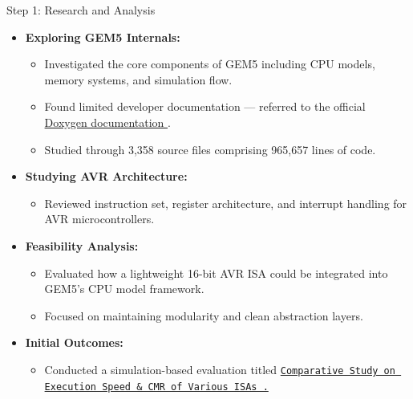 \begin{frame}{Step 1: Research and Analysis}
	\begin{itemize}
		\item \textbf{Exploring GEM5 Internals:}
		      \begin{itemize}
			      \item Investigated the core components of GEM5 including CPU models, memory systems, and simulation flow.
			      \item Found limited developer documentation — referred to the official \href{https://doxygen.gem5.org/develop/index.html}{Doxygen documentation \faLink}.
			      \item Studied through 3,358 source files comprising 965,657 lines of code.
		      \end{itemize}

		\item \textbf{Studying AVR Architecture:}
		      \begin{itemize}
			      \item Reviewed instruction set, register architecture, and interrupt handling for AVR microcontrollers.
		      \end{itemize}

		\item \textbf{Feasibility Analysis:}
		      \begin{itemize}
			      \item Evaluated how a lightweight 16-bit AVR ISA could be integrated into GEM5’s CPU model framework.
			      \item Focused on maintaining modularity and clean abstraction layers.
		      \end{itemize}

		\item \textbf{Initial Outcomes:}
		      \begin{itemize}
			      \item Conducted a simulation-based evaluation titled \href{https://drive.google.com/file/d/13ZroHuWGLApYXLkeWA3SBIlMh6KzfCqq/view?usp=sharing}{\texttt{Comparative Study on Execution Speed \& CMR of Various ISAs \faLink.}}
		      \end{itemize}
	\end{itemize}
\end{frame}


